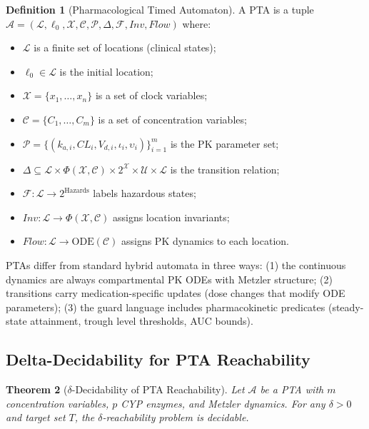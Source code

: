 \documentclass{article}
\newtheorem{theorem}{Theorem}[section]
\theoremstyle{definition}
\newtheorem{definition}[theorem]{Definition}
\begin{document}
\begin{definition}[Pharmacological Timed Automaton]
\label{def:pta}
A PTA is a tuple $\mathcal{A} = (\mathcal{L}, \ell_0, \mathcal{X}, \mathcal{C}, \mathcal{P}, \Delta, \mathcal{F}, \textit{Inv}, \textit{Flow})$ where:
\begin{itemize}
\item $\mathcal{L}$ is a finite set of locations (clinical states);
\item $\ell_0 \in \mathcal{L}$ is the initial location;
\item $\mathcal{X} = \{x_1, \ldots, x_n\}$ is a set of clock variables;
\item $\mathcal{C} = \{C_1, \ldots, C_m\}$ is a set of concentration variables;
\item $\mathcal{P} = \{(k_{a,i}, CL_i, V_{d,i}, \iota_i, \upsilon_i)\}_{i=1}^{m}$ is the PK parameter set;
\item $\Delta \subseteq \mathcal{L} \times \Phi(\mathcal{X}, \mathcal{C}) \times 2^{\mathcal{X}} \times \mathcal{U} \times \mathcal{L}$ is the transition relation;
\item $\mathcal{F}: \mathcal{L} \to 2^{\text{Hazards}}$ labels hazardous states;
\item $\textit{Inv}: \mathcal{L} \to \Phi(\mathcal{X}, \mathcal{C})$ assigns location invariants;
\item $\textit{Flow}: \mathcal{L} \to \text{ODE}(\mathcal{C})$ assigns PK dynamics to each location.
\end{itemize}
\end{definition}

PTAs differ from standard hybrid automata in three ways: (1) the continuous dynamics are always compartmental PK ODEs with Metzler structure; (2) transitions carry medication-specific updates (dose changes that modify ODE parameters); (3) the guard language includes pharmacokinetic predicates (steady-state attainment, trough level thresholds, AUC bounds).

\subsection{Delta-Decidability for PTA Reachability}

\begin{theorem}[$\delta$-Decidability of PTA Reachability]
\label{thm:delta}
Let $\mathcal{A}$ be a PTA with $m$ concentration variables, $p$ CYP enzymes, and Metzler dynamics. For any $\delta > 0$ and target set $T$, the $\delta$-reachability problem is decidable.
\end{theorem}
\end{document}

